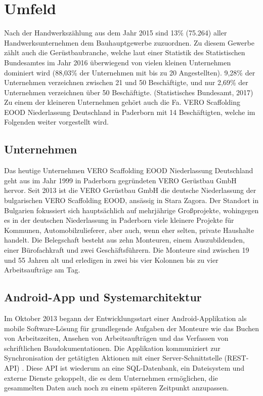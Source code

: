 
\section{Umfeld}
Nach der Handwerkszählung aus dem Jahr 2015 sind 13\% (75.264) aller Handwerksunternehmen dem Bauhauptgewerbe zuzuordnen. Zu diesem Gewerbe zählt auch die Gerüstbaubranche, welche laut einer Statistik des Statistischen Bundesamtes im Jahr 2016 überwiegend von vielen kleinen Unternehmen dominiert wird (88,03\% der Unternehmen mit bis zu 20 Angestellten). 9,28\% der Unternehmen verzeichnen zwischen 21 und 50 Beschäftigte, und nur 2,69\% der Unternehmen verzeichnen über 50 Beschäftigte. (Statistisches Bundesamt, 2017) \\

Zu einem der kleineren Unternehmen gehört auch die Fa. VERO Scaffolding EOOD Niederlassung Deutschland in Paderborn mit 14 Beschäftigten, welche im Folgenden weiter vorgestellt wird.

\subsection{Unternehmen}
Das heutige Unternehmen VERO Scaffolding EOOD Niederlassung Deutschland geht aus im Jahr 1999 in Paderborn gegründeten VERO Gerüstbau GmbH hervor. 
Seit 2013 ist die VERO Gerüstbau GmbH die deutsche Niederlassung der bulgarischen VERO Scaffolding EOOD, ansässig in Stara Zagora. Der Standort in Bulgarien fokussiert sich hauptsächlich auf mehrjährige Großprojekte, wohingegen es in der deutschen Niederlassung in Paderborn viele kleinere Projekte für Kommunen, Automobilzulieferer, aber auch, wenn eher selten, private Haushalte handelt.
Die Belegschaft besteht aus zehn Monteuren, einem Auszubildenden, einer Bürofachkraft und zwei Geschäftsführern. Die Monteure sind zwischen 19 und 55 Jahren alt und erledigen in zwei bis vier Kolonnen bis zu vier Arbeitsaufträge am Tag.

\subsection{Android-App und Systemarchitektur}
Im Oktober 2013 begann der Entwicklungsstart einer Android-Applikation als mobile Software-Lösung für grundlegende Aufgaben der Monteure wie das Buchen von Arbeitszeiten, Ansehen von Arbeitsaufträgen und das Verfassen von schriftlichen Baudokumentationen. Die Applikation kommuniziert zur Synchronisation der getätigten Aktionen mit einer Server-Schnittstelle (REST-API) . Diese API ist wiederum an eine SQL-Datenbank, ein Dateisystem und externe Dienste gekoppelt, die es dem Unternehmen ermöglichen, die gesammelten Daten auch noch zu einem späteren Zeitpunkt anzupassen. \\

